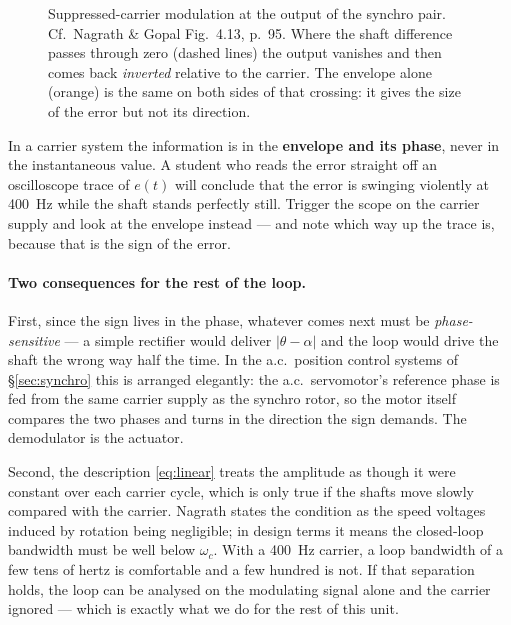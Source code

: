 \documentclass[11pt,a4paper]{article}
\begin{document}
\begin{figure}[H]
\caption{Suppressed-carrier modulation at the output of the synchro pair.
Cf.\ Nagrath \& Gopal Fig.~4.13, p.~95. Where the shaft difference passes
through zero (dashed lines) the output vanishes and then comes back
\emph{inverted} relative to the carrier. The envelope alone (orange) is the
same on both sides of that crossing: it gives the size of the error but not
its direction.}
\label{fig:carrier}
\end{figure}

\begin{pitfall}
In a carrier system the information is in the \textbf{envelope and its
phase}, never in the instantaneous value. A student who reads the error
straight off an oscilloscope trace of $e(t)$ will conclude that the error is
swinging violently at \SI{400}{\hertz} while the shaft stands perfectly still.
Trigger the scope on the carrier supply and look at the envelope instead ---
and note which way up the trace is, because that is the sign of the error.
\end{pitfall}

\paragraph{Two consequences for the rest of the loop.} First, since the sign
lives in the phase, whatever comes next must be \emph{phase-sensitive} --- a
simple rectifier would deliver $|\theta-\alpha|$ and the loop would drive the
shaft the wrong way half the time. In the a.c.\ position control systems of
\S\ref{sec:synchro} this is arranged elegantly: the a.c.\ servomotor's
reference phase is fed from the same carrier supply as the synchro rotor, so
the motor itself compares the two phases and turns in the direction the sign
demands. The demodulator is the actuator.

Second, the description \eqref{eq:linear} treats the amplitude as though it
were constant over each carrier cycle, which is only true if the shafts move
slowly compared with the carrier. Nagrath states the condition as the speed
voltages induced by rotation being negligible; in design terms it means the
closed-loop bandwidth must be well below $\omega_{c}$. With a
\SI{400}{\hertz} carrier, a loop bandwidth of a few tens of hertz is
comfortable and a few hundred is not. If that separation holds, the loop can
be analysed on the modulating signal alone and the carrier ignored --- which
is exactly what we do for the rest of this unit.
\end{document}
